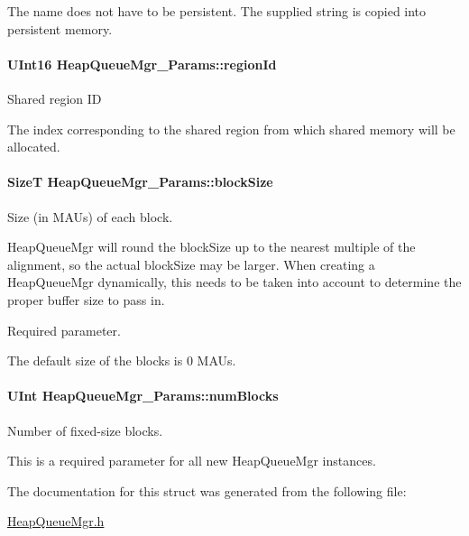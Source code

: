 The name does not have to be persistent. The supplied string is copied into persistent memory. 
\paragraph[{regionId}]{\setlength{\rightskip}{0pt plus 5cm}UInt16 {\bf HeapQueueMgr\_\-Params::regionId}}\hfill\label{struct_heap_queue_mgr___params_a8b3bb33eb02bcf2acd93993c23b17ccd}
Shared region ID

The index corresponding to the shared region from which shared memory will be allocated. 
\paragraph[{blockSize}]{\setlength{\rightskip}{0pt plus 5cm}SizeT {\bf HeapQueueMgr\_\-Params::blockSize}}\hfill\label{struct_heap_queue_mgr___params_aeb3a83b8f0c08c05c5c250edf36b8bac}
Size (in MAUs) of each block.

HeapQueueMgr will round the blockSize up to the nearest multiple of the alignment, so the actual blockSize may be larger. When creating a HeapQueueMgr dynamically, this needs to be taken into account to determine the proper buffer size to pass in.

Required parameter.

The default size of the blocks is 0 MAUs. 
\paragraph[{numBlocks}]{\setlength{\rightskip}{0pt plus 5cm}UInt {\bf HeapQueueMgr\_\-Params::numBlocks}}\hfill\label{struct_heap_queue_mgr___params_aa8c44bb82eb7424aa86e55a2c03dd170}
Number of fixed-\/size blocks.

This is a required parameter for all new HeapQueueMgr instances. 

The documentation for this struct was generated from the following file:\begin{DoxyCompactItemize}
\item 
\hyperlink{_heap_queue_mgr_8h}{HeapQueueMgr.h}\end{DoxyCompactItemize}
